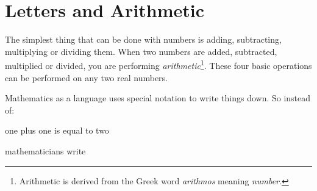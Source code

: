     \section{Letters and Arithmetic}
            \nopagebreak
      \label{m38346*id171917}The simplest thing that can be done with numbers is adding, subtracting, multiplying or dividing them. When two numbers are added, subtracted, multiplied or divided, you are performing \textsl{arithmetic}\label{m38346*uid2}\footnote{Arithmetic is derived from the Greek word \textsl{arithmos} meaning \textsl{number}.}. These four basic operations can be performed on any two real numbers.\par 
      \label{m38346*id171947}Mathematics as a language uses special notation to write things down. So instead of:\par 
      \label{m38346*eip-237}one plus one is equal to two\par \label{m38346*id171974}mathematicians write\par 
      \label{m38346*id171980}\nopagebreak\noindent{}
